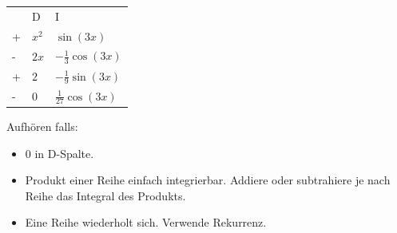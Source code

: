 \documentclass[a4paper,10pt]{article}
\begin{document}
\begin{table}[h]
  \begin{tabular}{lll}
    & D & I \\
  + & $x^2$ & $\sin(3x)$  \\
  - & $2x$ & $-\frac{1}{3}\cos(3x)$  \\
  + & $2$ & $-\frac{1}{9}\sin(3x)$  \\
  - & $0$ & $\frac{1}{27}\cos(3x)$  
  \end{tabular}
\end{table}

Aufhören falls:
\begin{itemize}
  \item $0$ in D-Spalte.
  \item Produkt einer Reihe einfach integrierbar. Addiere oder subtrahiere je nach Reihe das Integral des Produkts.
  \item Eine Reihe wiederholt sich. Verwende Rekurrenz.
\end{itemize}

\endgroup
\end{document}

